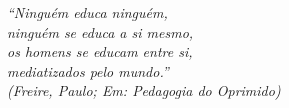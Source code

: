 \documentclass[
  12pt,                                         %
  openright,                                   %
  openany,
  twoside,                                     %
  a4paper,                                      %
  inline,
  english,                                      %
  brazil,                                       %
  ]{abntex2}
\begin{document}
\begin{agradecimentos}
    
\end{agradecimentos}

\begin{epigrafe}
    \vspace*{\fill}
  \begin{flushright}
    \textit{``Ninguém educa ninguém,\\ninguém se educa a si mesmo,\\os homens se educam entre si,\\ mediatizados pelo mundo.''\\
    (Freire, Paulo; Em: Pedagogia do Oprimido)}
  \end{flushright}
\end{epigrafe}

\begin{resumo} %

\end{resumo}

\begin{resumo}[Abstract] %

\end{resumo}

\listoffigures*
\cleardoublepage

\begin{KeepFromToc}
\lstlistoflistings
\end{KeepFromToc}
\cleardoublepage

\listoftables*
\cleardoublepage

    
\printglossaries
\cleardoublepage


\tableofcontents*
\cleardoublepage

\textual
\end{document}
